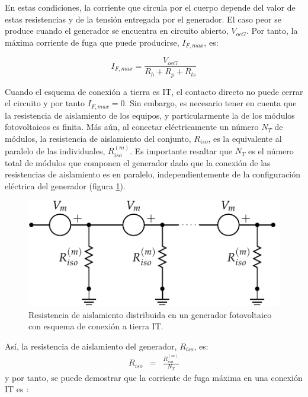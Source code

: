 En estas condiciones, la corriente que circula por el cuerpo depende
del valor de estas resistencias y de la tensión entregada por el generador.
El caso peor se produce cuando el generador se encuentra en circuito
abierto, $V_{ocG}$. Por tanto, la máxima corriente de fuga que puede
producirse, $I_{F,max}$,
es:

\begin{equation}
I_{F,max}=\frac{V_{ocG}}{R_{h}+R_{p}+R_{ts}}\label{eq:IfmaxTT}\end{equation}


Cuando el esquema de conexión a tierra es IT, el contacto directo
no puede cerrar el circuito y por tanto $I_{F,max}=0$. Sin embargo,
es necesario tener en cuenta que la resistencia de aislamiento de
los equipos, y particularmente la de los módulos fotovoltaicos es
finita. Más aún, al conectar eléctricamente un número $N_{T}$
de módulos, la resistencia de aislamiento del conjunto, $R_{iso}$,
es la equivalente al paralelo de las individuales, $R_{iso}^{(m)}$.
Es importante resaltar que $N_{T}$ es el número total de módulos
que componen el generador dado que la conexión de las resistencias
de aislamiento es en paralelo, independientemente de la configuración
eléctrica del generador (figura \ref{fig:RisoDistribuidaIT}). 

%
\begin{figure}
\includegraphics{../figs/ContactoDirectoIT}

\caption{\label{fig:RisoDistribuidaIT}Resistencia de aislamiento distribuida
en un generador fotovoltaico con esquema de conexión a tierra IT.}

\end{figure}


Así, la resistencia de aislamiento del generador, $R_{iso}$, es:\begin{eqnarray}
R_{iso} & = & \frac{R_{iso}^{(m)}}{N_{T}}\label{eq:RisoIT}\end{eqnarray}
y por tanto, se puede demostrar que la corriente de fuga máxima en
una conexión IT es \cite{Gomez-Vidal2000}: 

